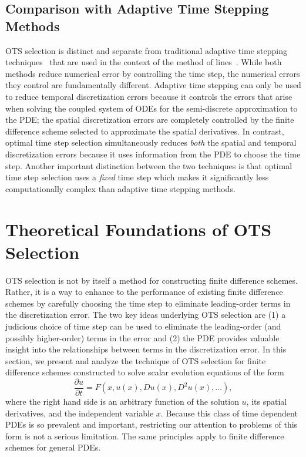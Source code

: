\documentclass[fleqn,12pt,twoside]{article}
\newcommand{\beq}{\begin{equation}}
\newcommand{\eeq}{\end{equation}}
\begin{document}
\subsection{Comparison with Adaptive Time Stepping Methods}
OTS selection is distinct and separate from traditional adaptive time stepping 
techniques~\cite{iserles_book,shampine_2005} that are used in the 
context of the method of lines~\cite{iserles_book,gko_book}.  
While both methods reduce numerical error by controlling the time step, the 
numerical errors they control are fundamentally different.  Adaptive time 
stepping can only be used to reduce temporal discretization errors because it 
controls the errors that arise when solving the coupled system of ODEs for the 
semi-discrete approximation to the PDE; the spatial discretization errors 
are completely controlled by the finite difference scheme selected to 
approximate the spatial derivatives.  
In contrast, optimal time step selection simultaneously reduces 
\emph{both} the spatial and temporal discretization errors because it
uses information from the PDE to choose the time step.  Another important 
distinction between the two techniques is that optimal time step selection 
uses a \emph{fixed} time step which makes it significantly less 
computationally complex than adaptive time stepping methods.


\section{\label{sec:OTS} Theoretical Foundations of OTS Selection}
OTS selection is not by itself a method for constructing finite difference 
schemes.  Rather, it is a way to enhance to the performance of existing 
finite difference schemes by carefully choosing the time step to eliminate
leading-order terms in the discretization error.  The two key ideas
underlying OTS selection are 
(1) a judicious choice of time step can be used to eliminate the leading-order 
(and possibly higher-order) terms in the error
and
(2) the PDE provides valuable insight into the relationships between terms
in the discretization error. 
In this section, we present and analyze the technique of OTS selection for
finite difference schemes constructed to solve scalar evolution equations of
the form 
\beq
  \frac{\partial u}{\partial t} = 
    F\left(x, u(x), D u(x), D^2 u(x), \ldots \right), 
\eeq
where the right hand side is an arbitrary function of the solution $u$, its 
spatial derivatives, and the independent variable $x$.
Because this class of time dependent PDEs is so prevalent and important, 
restricting our attention to problems of this form is not a serious 
limitation.  The same principles apply to finite difference schemes for 
general PDEs.
\end{document}
